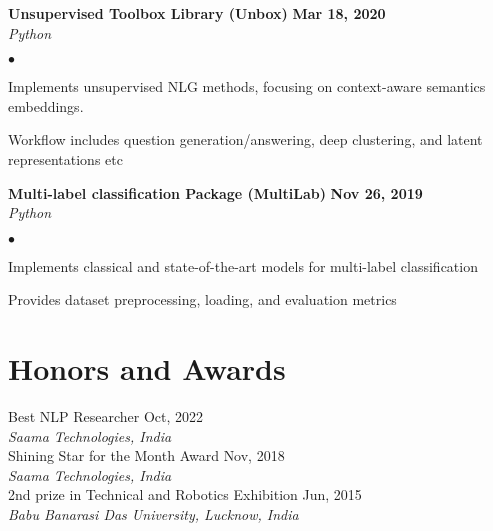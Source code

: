 \documentclass[margin,line]{res}
\newenvironment{list2}{
  \begin{list}{$\bullet$}{%
      \setlength{\itemsep}{0in}
      \setlength{\parsep}{0in} \setlength{\parskip}{0in}
      \setlength{\topsep}{0in} \setlength{\partopsep}{0in} 
      \setlength{\leftmargin}{0.2in}}}{\end{list}}
\begin{document}
\begin{resume}
{\textbf{Unsupervised Toolbox Library (Unbox)} \hfill {\bf{Mar 18, 2020}}}\\
{\em Python} \hfill {\href{https://github.com/monk1337/Unbox/tree/master}{\color{blue}{\textbf{[Github]}}}}

\begin{list2}
\item Implements unsupervised NLG methods, focusing on context-aware semantics embeddings.
\item Workflow includes question generation/answering, deep clustering, and latent representations etc
\end{list2}

{\textbf{Multi-label classification Package (MultiLab)} \hfill {\bf {Nov 26, 2019}}}\\
{\em Python} \hfill {\href{https://github.com/monk1337/MultiLab}{\color{blue}{\textbf{[Github]}}}}

\begin{list2}

\item Implements classical and state-of-the-art models for multi-label classification
\item Provides dataset preprocessing, loading, and evaluation metrics
\end{list2}

\section{\sc Honors and Awards}
{Best NLP Researcher \hfill {Oct, 2022}}\\
{\em Saama Technologies, India }
\vspace*{.3cm}\\
{Shining Star for the Month Award \hfill {Nov, 2018}}\\
{\em Saama Technologies, India }
\vspace*{.3cm}\\
{2nd prize in Technical and Robotics Exhibition \hfill  {Jun, 2015}}\\
{\em Babu Banarasi Das University, Lucknow, India }

\end{resume}
\end{document}
